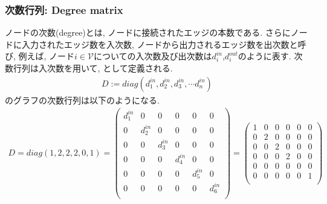 \subsubsection*{次数行列: Degree matrix}
ノードの次数(degree)とは, ノードに接続されたエッジの本数である.
さらにノードに入力されたエッジ数を入次数, ノードから出力されるエッジ数を出次数と呼び, 
例えば, ノード$i\in \mathcal{V}$についての入次数及び出次数は$d_i^{in}$,$d_i^{out}$のように表す.
次数行列は入次数を用いて, として定義される.
\begin{align}
  D:=diag(d_1^{in}, d_2^{in}, d_3^{in},\cdots d_n^{in})
  \label{eq:def_degree}
\end{align}
のグラフの次数行列は以下のようになる.
\begin{align}
  D=diag(1, 2, 2, 2, 0, 1)=
  \begin{pmatrix}
    \displaystyle d_1^{in}&0&0&0&0&0\\
    0&\displaystyle d_2^{in}&0&0&0&0\\
    0&0&\displaystyle d_3^{in}&0&0&0\\
    0&0&0&\displaystyle d_4^{in}&0&0\\
    0&0&0&0&\displaystyle d_5^{in}&0\\
    0&0&0&0&0&\displaystyle d_6^{in}\\
  \end{pmatrix}= 
  \begin{pmatrix}
    1&0&0&0&0&0\\
    0& 2&0&0&0&0\\
    0&0& 2&0&0&0\\
    0&0&0& 2&0&0\\
    0&0&0&0& 0&0\\
    0&0&0&0&0& 1\\
  \end{pmatrix}   
\end{align}
